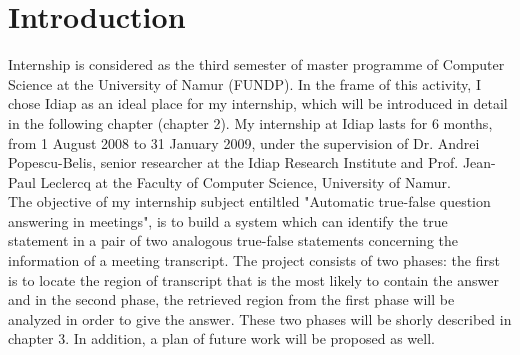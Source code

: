 \documentclass[12pt, a4paper]{report}
\begin{document}




\newpage
\tableofcontents

\newpage
\listoffigures



\chapter{Introduction}

Internship is considered as the third semester of master programme of Computer Science at the University of Namur (FUNDP). In the frame of this activity, I chose Idiap as an ideal place for my internship, which will be introduced in detail in the following chapter (chapter 2). My internship at Idiap lasts for 6 months, from 1 August 2008 to 31 January 2009, under the supervision of Dr. Andrei Popescu-Belis, senior researcher at the Idiap Research Institute and Prof. Jean-Paul Leclercq at the Faculty of Computer Science, University of Namur.\\

The objective of my internship subject entiltled "Automatic true-false question answering in meetings", is to build a system which can identify the true statement in a pair of two analogous true-false statements concerning the information of a meeting transcript. The project consists of two phases: the first is to locate the region of transcript that is the most likely to contain the answer and in the second phase, the retrieved region from the first phase will be analyzed in order to give the answer. These two phases will be shorly described in chapter 3. In addition, a plan of future work will be proposed as well.\\
\end{document}
